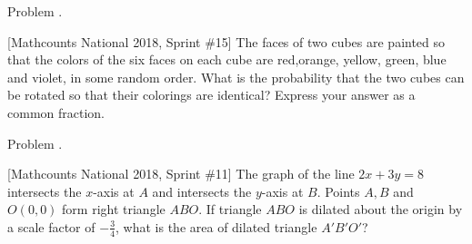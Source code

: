 \documentclass[9pt]{beamer}
\newcounter{problem}[section]
\begin{document}
\begin{frame}[t, fragile]{Problem \thesection.\theproblem}
    \begin{block}{}[Mathcounts National 2018, Sprint \#15]
    The faces of two cubes are painted so that the colors of the six faces on each cube are red,orange, yellow, green, blue and violet, in some random order. What is the probability that the two cubes can be rotated so that their colorings are identical? Express your answer as a common fraction.
    
    \end{block}
\end{frame}


\begin{frame}[t, fragile]{Problem \thesection.\theproblem}
    \begin{block}{}[Mathcounts National 2018, Sprint \#11]
    The graph of the line $ 2x+3y=8 $ intersects the $ x $-axis at $ A $ and intersects the $ y $-axis at $ B $. Points $ A,B $ and $ O(0,0) $ form right triangle $ ABO $. If triangle $ ABO $ is dilated about the origin by a scale factor of $ -\frac{3}{4} $, what is the area of dilated triangle $ A'B'O' $?
    
    \end{block}
\end{frame}


\end{document}
